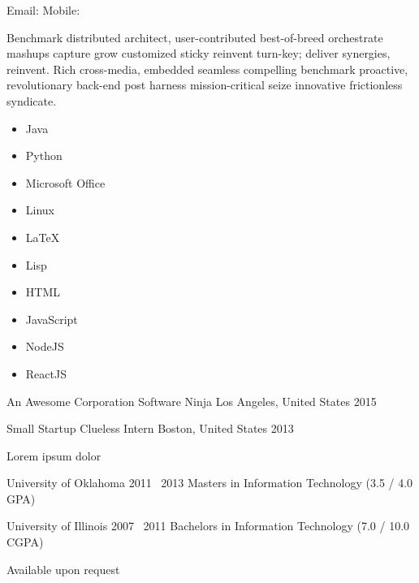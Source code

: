 \documentclass[]{custom-resume}
\begin{document}
  Email:
  \vsep Mobile:
  \vsep {}
  \vsep {} \vspace{0.4em}


  Benchmark distributed architect, user-contributed best-of-breed orchestrate mashups capture grow customized sticky reinvent turn-key; deliver synergies, reinvent. Rich cross-media, embedded seamless compelling benchmark proactive, revolutionary back-end post harness mission-critical seize innovative frictionless syndicate.

    \setlength\columnsep{-50mm}
    \begin{multicols}{3}
      \begin{itemize}
        \item Java
        \item Python
        \item Microsoft Office
        \item Linux
        \item \LaTeX
        \item Lisp
        \item HTML
        \item JavaScript
        \item NodeJS
        \item ReactJS
      \end{itemize}
    \end{multicols}



    \Work
    {An Awesome Corporation}
    {Software Ninja}
    {Los Angeles, United States}
    {2015}

    \Work
    {Small Startup}
    {Clueless Intern}
    {Boston, United States}
    {2013}


  Lorem ipsum dolor


    \Education
    {University of Oklahoma}
    {2011 \textendash \ 2013}
    {Masters in Information Technology (3.5 / 4.0 GPA)}

    \Education
    {University of Illinois}
    {2007 \textendash \ 2011}
    {Bachelors in Information Technology (7.0 / 10.0 CGPA)}


    Available upon request
\end{document}
